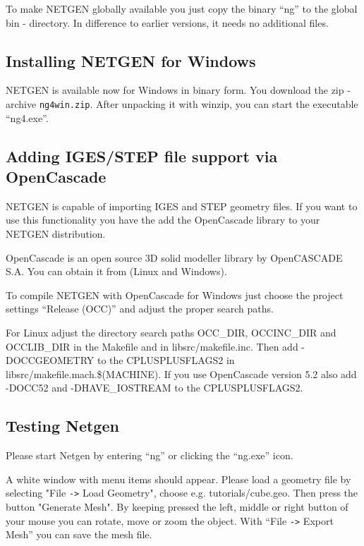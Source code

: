 \documentclass[12pt]{book}
\begin{document}
\medskip

To make NETGEN globally available you just copy the binary ``ng'' 
to the global bin - directory. In difference to earlier versions,
it needs no additional files.

\subsection{Installing NETGEN for Windows}

NETGEN is available now for Windows in binary form. You download
the zip - archive {\tt ng4win.zip}. After unpacking it with winzip,
you can start the executable ``ng4.exe''.

\subsection{Adding IGES/STEP file support via OpenCascade}
\label{subsec_occ}

NETGEN is capable of importing IGES and STEP geometry files. If you want to use this functionality you have the add the OpenCascade library to your NETGEN distribution.

OpenCascade is an open source 3D solid modeller library by OpenCASCADE S.A. You can obtain it from  (Linux and Windows).

To compile NETGEN with OpenCascade for Windows just choose the project settings ``Release (OCC)'' and adjust the proper search paths.

For Linux adjust the directory search paths OCC\_DIR, OCCINC\_DIR and OCCLIB\_DIR in the Makefile and in libsrc/makefile.inc. Then add -DOCCGEOMETRY to the CPLUSPLUSFLAGS2 in libsrc/makefile.mach.\$(MACHINE). If you use OpenCascade version 5.2 also add -DOCC52 and -DHAVE\_IOSTREAM to the CPLUSPLUSFLAGS2.

\subsection{Testing Netgen}
Please start Netgen by entering ``ng'' or clicking the ``ng.exe'' icon.

A white window with menu items should appear.  Please load a geometry
file by selecting "File {\tt ->} Load Geometry", choose e.g.
tutorials/cube.geo.  Then press the button "Generate Mesh". By keeping
pressed the left, middle or right button of your mouse you can rotate,
move or zoom the object.  With ``File {\tt->} Export Mesh'' you can
save the mesh file.
\end{document}
